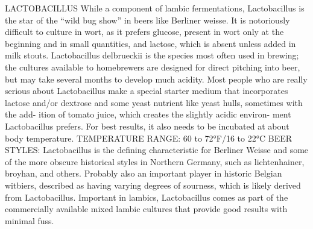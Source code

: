 \documentclass[a4paper,parskip=half]{scrartcl}
\begin{document}
\parencite[311]{Mosher2015}
LACTOBACILLUS
While a component of lambic fermentations, Lactobacillus is the
star of the “wild bug show” in beers like Berliner weisse. It is
notoriously difficult to culture in wort, as it prefers glucose, present
in wort only at the beginning and in small quantities, and lactose,
which is absent unless added in milk stouts. Lactobacillus
delbrueckii is the species most often used in brewing; the cultures
available to homebrewers are designed for direct pitching into
beer, but may take several months to develop much acidity.
Most people who are really serious about Lactobacillus make a
special starter medium that incorporates lactose and/or dextrose
and some yeast nutrient like yeast hulls, sometimes with the add-
ition of tomato juice, which creates the slightly acidic environ-
ment Lactobacillus prefers. For best results, it also needs to be
incubated at about body temperature.
TEMPERATURE RANGE: 60 to 72°F/16 to 22°C
BEER STYLES: Lactobacillus is the deﬁning characteristic for
Berliner Weisse and some of the more obscure historical styles
in Northern Germany, such as lichtenhainer, broyhan, and others.
Probably also an important player in historic Belgian witbiers,
described as having varying degrees of sourness, which is likely
derived from Lactobacillus. Important in lambics, Lactobacillus
comes as part of the commercially available mixed lambic cultures
that provide good results with minimal fuss.
\end{document}
